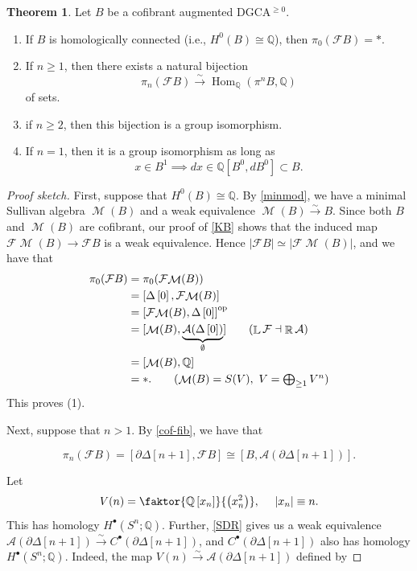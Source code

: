 \documentclass[10pt,letterpaper,cm]{nupset}
\theoremstyle{definition}
\theoremstyle{theorem}
\newtheorem{theorem}[defn]{Theorem}
\theoremstyle{remark}
\newcommand{\A}{\mathcal A}
\newcommand{\F}{\mathcal F}
\DeclareMathOperator{\Ll}{\mathbb L}
\newcommand{\Q}{\mathbb Q}
\DeclareMathOperator{\R}{\mathbb{R}}
\newcommand{\1}{\mathbb{1}}
\newcommand{\0}{\vec 0}
\DeclareMathOperator{\M}{\mathcal{M}}
\DeclareMathOperator{\Hom}{Hom}
\DeclareMathOperator{\op}{op}
\newcommand{\be}{\begin{enumerate}}
\newcommand{\ee}{\end{enumerate}}
\begin{document}
\begin{theorem}\label{dualiso}
Let $B$ be a cofibrant augmented DGCA$^{\geq 0}$. 
\be[label = (\arabic*)]
\item If $B$ is homologically connected (i.e., $H^0(B) \cong \Q$), then $\pi_0(\F{B}) = \ast$. 
\item If $n \geq 1$, then there exists a natural bijection
\[
\pi_n(\F{B}) \xrightarrow{\sim} \Hom_{\Q}(\pi^n{B}, \Q)
\] of sets.
\item if $n \geq 2$, then this bijection is a group isomorphism. 
\item If $n =1$, then it is a group isomorphism as long as 
\[
x\in B^1 \implies d{x} \in \Q\left[B^0, d{B^0}\right] \subset B
.\]
\ee
\end{theorem}
\begin{proof}[Proof sketch] 
First,  suppose that $H^0(B) \cong \Q$. By \cref{minmod}, we have a minimal Sullivan algebra $\M(B)$ and a weak equivalence $\M(B) \xrightarrow{\sim} B$. Since both $B$ and $\M(B)$ are cofibrant, our proof of \cref{KB} shows that the induced map $\F{\M(B)} \to \F{B}$ is a weak equivalence. Hence $\left\lvert{\F{B}}\right\rvert \simeq \left\lvert{\F{\M(B)}}\right\rvert$, and  we have that 
\begin{align*}
\pi_0(\F{B}) & = \pi_0(\F{\M(B)}) 
\\ & = \left[\Delta\left[0\right], \F{\M(B)}\right]
\\ & =   \left[\F{\M(B)}, \Delta\left[0\right]\right]^{\op}
\\ & =  [\M(B), \underbrace{\A(\Delta\left[0\right])}_{\emptyset}] \tag{$\Ll{\F} \dashv \R{\A}$}
\\ & = \left[\M(B), \Q\right] 
\\ & = \ast. \tag{$\M(B) = S(V), \ V = \bigoplus_{\geq 1}V^n$}
\end{align*}
This proves (1).

Next, suppose that $n > 1$. By \cref{cof-fib}, we have that

\[
\pi_n(\F{B})  = \left[\partial{\Delta\left[n+1\right]}, \F{B}\right] \cong \left[B, \A(\partial{\Delta\left[n+1\right]})\right]
.\]

Let 
\[
V(n) = \faktor{\Q\left[x_n\right]}{\left(x_n^2\right)}, \ \quad \left\lvert{x_n}\right\rvert \equiv n
.\] This has homology $H^{\bullet}(S^n; \Q)$. Further, \cref{SDR} gives us a weak equivalence  \linebreak $ \A(\partial{\Delta\left[n+1\right]}) \xrightarrow{\sim} C^{\bullet}(\partial{\Delta\left[n+1\right]})$, and $C^{\bullet}(\partial{\Delta\left[n+1\right]})$ also has homology  $H^{\bullet}(S^n; \Q)$. Indeed, the map $V(n) \xrightarrow{\sim}  \A(\partial{\Delta\left[n+1\right]})$ defined by


\end{proof}
\end{document}
